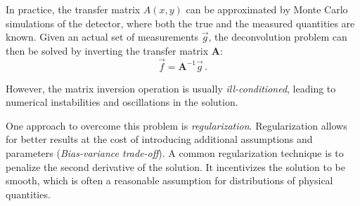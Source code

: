 In practice,
the transfer matrix $A(x, y)$ can be approximated
by Monte Carlo simulations of the detector,
  where both the true and the measured quantities are known.
Given an actual set of measurements $\vec{g}$,
the deconvolution problem can then be solved
by inverting the transfer matrix $\symbf{A}$:
\begin{equation}
  \label{eq:deconvolution_problem:discretized:inverse}
  \vec{f} = \symbf{A}^{-1} \vec{g} \, .
\end{equation}

However,
the matrix inversion operation is usually \emph{ill-conditioned},
  leading to numerical instabilities
  and oscillations in the solution.


One approach to overcome this problem
is \emph{regularization}.
Regularization allows for better results
  at the cost of introducing additional assumptions and parameters
    (\emph{Bias-variance trade-off}).
A common regularization technique
  is to penalize the second derivative of the solution.
It incentivizes the solution to be smooth,
  which is often a reasonable assumption for distributions of physical quantities.


